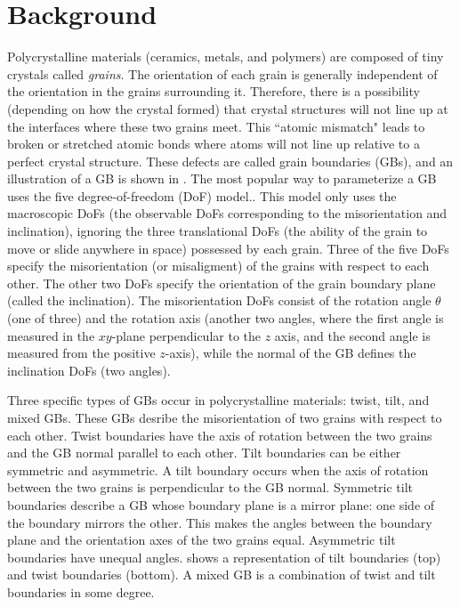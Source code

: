 \documentclass[twoside,senior]{BYUPhys}
\begin{document}
\section{Background\label{intro:background}}
Polycrystalline materials (ceramics, metals, and polymers) are composed of tiny crystals called \emph{grains}.  The orientation of each grain is generally independent of the orientation in the grains surrounding it. Therefore, there is a possibility (depending on how the crystal formed\cite{callister2003}) that crystal structures will not line up at the interfaces where these two grains meet.  This ``atomic mismatch"\cite{callister2003} leads to broken or stretched atomic bonds where atoms will not line up relative to a perfect crystal structure.  These defects are called grain boundaries (GBs), and an illustration of a GB is shown in . The most popular way to parameterize a GB uses the five degree-of-freedom (DoF) model.\cite{patala2013, lejcek2010, homer2015, bulatov2014, harbison2015, rohrer2011}.  This model only uses the macroscopic DoFs (the observable DoFs corresponding to the misorientation and inclination), ignoring the three translational DoFs (the ability of the grain to move or slide anywhere in space) possessed by each grain.  Three of the five DoFs specify the misorientation (or misaligment) of the grains with respect to each other.  The other two DoFs specify the orientation of the grain boundary plane (called the inclination).  The misorientation DoFs consist of the rotation angle $\theta$ (one of three) and the rotation axis (another two angles, where the first angle is measured in the $xy$-plane perpendicular to the $z$ axis, and the second angle is measured from the positive $z$-axis), while the normal of the GB defines the inclination DoFs (two angles).\cite{lejcek2010}

Three specific types of GBs occur in polycrystalline materials: twist, tilt, and mixed GBs.\cite{lejcek2010, rohrer2011}  These GBs desribe the misorientation of two grains with respect to each other.  Twist boundaries have the axis of rotation between the two grains and the GB normal parallel to each other. Tilt boundaries can be either symmetric and asymmetric.  A tilt boundary occurs when the axis of rotation between the two grains is perpendicular to the GB normal.  Symmetric tilt boundaries describe a GB whose boundary plane is a mirror plane: one side of the boundary mirrors the other.  This makes the angles between the boundary plane and the orientation axes of the two grains equal. Asymmetric tilt boundaries have unequal angles.   shows a representation of tilt boundaries (top) and twist boundaries (bottom).  A mixed GB is a combination of twist and tilt boundaries in some degree.
\end{document}
